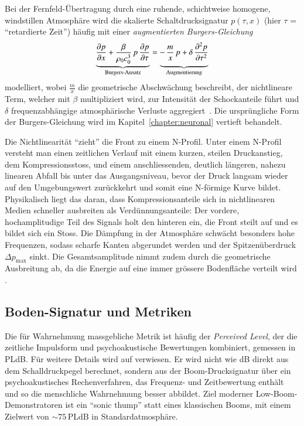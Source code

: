 Bei der Fernfeld-Übertragung durch eine ruhende, schichtweise homogene,
windstillen Atmosphäre wird die skalierte Schaltdrucksignatur $p(\tau,x)$
(hier $\tau$ = ``retardierte Zeit'') häufig mit einer
\emph{augmentierten Burgers-Gleichung}
\begin{equation}
  \underbrace{\frac{\partial p}{\partial x}
  +\frac{\beta}{\rho_0 c_0^{3}}\,p\,\frac{\partial p}{\partial \tau}}_{\text{Burgers-Ansatz}}
  =
  \underbrace{-\,\frac{m}{x}\,p \vphantom{\frac{\beta}{\rho_0 c_0^{3}}}
  +\delta\,\frac{\partial^2 p}{\partial \tau^2}}_{\text{Augmentierung}}
  \label{eq:aug-burgers}
\end{equation}
modelliert,
wobei $\frac{m}{x}$ die geometrische Abschwächung beschreibt, der nichtlineare
Term, welcher mit $\beta$ multipliziert wird, zur Intensität der Schockanteile
führt und $\delta$ frequenzabhängige atmosphärische Verluste aggregiert~\cite{schall:burgersJASA}.
Die ursprüngliche Form der Burgers-Gleichung wird im
Kapitel~\ref{chapter:neuronal} vertieft behandelt.

Die Nichtlinearität ``zieht'' die Front zu einem N-Profil.
Unter einem N-Profil versteht man einen zeitlichen Verlauf mit einem kurzen,
steilen Druckanstieg, dem Kompressionsstoss, und einem anschliessenden, deutlich
längeren, nahezu linearen Abfall bis unter das Ausgangsniveau, bevor der
Druck langsam wieder auf den Umgebungswert zurückkehrt und somit eine
N-förmige Kurve bildet.
Physikalisch liegt das daran, dass Kompressionsanteile sich in nichtlinearen
Medien schneller ausbreiten als Verdünnungsanteile: Der vordere,
hochamplitudige Teil des Signals holt den hinteren ein, die Front steilt
auf und es bildet sich ein Stoss.
Die Dämpfung in der Atmosphäre schwächt besonders hohe Frequenzen,
sodass scharfe Kanten abgerundet werden und der Spitzenüberdruck
\(\Delta p_\mathrm{max}\) sinkt.
Die Gesamtsamplitude nimmt zudem durch die geometrische Ausbreitung ab, da
die Energie auf eine immer grössere Bodenfläche verteilt wird
\cite{schall:rallabhandi2023}.

\subsection{Boden-Signatur und Metriken}
Die für Wahrnehmung massgebliche Metrik ist häufig der \textit{Perceived Level},
%
der die zeitliche Impulsform und psychoakustische Bewertungen kombiniert,
gemessen in PLdB. Für weitere Details wird auf \cite{schall:x59pldb} verwiesen.
Er wird nicht wie dB direkt aus dem Schalldruckpegel berechnet,
sondern aus der Boom-Drucksignatur über ein psychoakustisches Rechenverfahren,
das Frequenz- und Zeitbewertung enthält und so die menschliche
Wahrnehmung besser abbildet.
Ziel moderner Low-Boom-Demonstratoren ist ein ``sonic thump'' statt
eines klassischen Booms, mit einem Zielwert von
${\sim}75\,\text{PLdB}$ in Standardatmosphäre.
%


